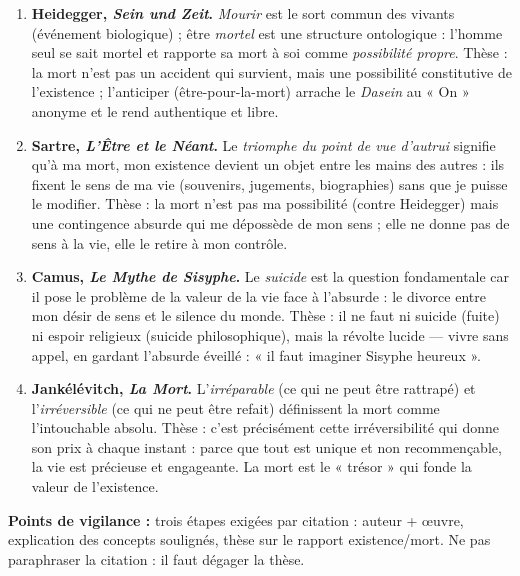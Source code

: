 \documentclass[11pt]{article}
\begin{document}
\begin{corrige}
\begin{enumerate}
\item \textbf{Heidegger, \emph{Sein und Zeit}.} \emph{Mourir} est le sort commun des vivants (événement biologique) ; être \emph{mortel} est une structure ontologique : l'homme seul se sait mortel et rapporte sa mort à soi comme \emph{possibilité propre}. Thèse : la mort n'est pas un accident qui survient, mais une possibilité constitutive de l'existence ; l'anticiper (être-pour-la-mort) arrache le \emph{Dasein} au « On » anonyme et le rend authentique et libre.
\item \textbf{Sartre, \emph{L'Être et le Néant}.} Le \emph{triomphe du point de vue d'autrui} signifie qu'à ma mort, mon existence devient un objet entre les mains des autres : ils fixent le sens de ma vie (souvenirs, jugements, biographies) sans que je puisse le modifier. Thèse : la mort n'est pas ma possibilité (contre Heidegger) mais une contingence absurde qui me dépossède de mon sens ; elle ne donne pas de sens à la vie, elle le retire à mon contrôle.
\item \textbf{Camus, \emph{Le Mythe de Sisyphe}.} Le \emph{suicide} est la question fondamentale car il pose le problème de la valeur de la vie face à l'absurde : le divorce entre mon désir de sens et le silence du monde. Thèse : il ne faut ni suicide (fuite) ni espoir religieux (suicide philosophique), mais la révolte lucide — vivre sans appel, en gardant l'absurde éveillé : « il faut imaginer Sisyphe heureux ».
\item \textbf{Jankélévitch, \emph{La Mort}.} L'\emph{irréparable} (ce qui ne peut être rattrapé) et l'\emph{irréversible} (ce qui ne peut être refait) définissent la mort comme l'intouchable absolu. Thèse : c'est précisément cette irréversibilité qui donne son prix à chaque instant : parce que tout est unique et non recommençable, la vie est précieuse et engageante. La mort est le « trésor » qui fonde la valeur de l'existence.
\end{enumerate}
\textbf{Points de vigilance :} trois étapes exigées par citation : auteur + œuvre, explication des concepts soulignés, thèse sur le rapport existence/mort. Ne pas paraphraser la citation : il faut dégager la thèse.
\end{corrige}
\end{document}
